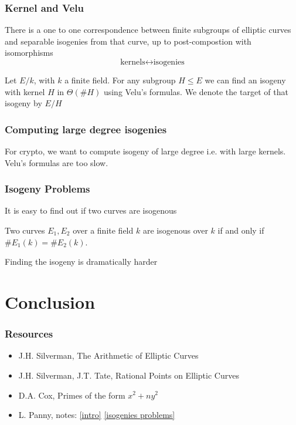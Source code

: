 \documentclass{beamer}
\begin{document}
\begin{frame}
    \frametitle{Kernel and Velu}
    \begin{theorem}
       There is a one to one correspondence between finite subgroups of elliptic curves 
       and separable isogenies from that curve, up to post-compostion with isomorphisms
       \[ \text{kernels} \longleftrightarrow \text{isogenies} \]

    \end{theorem}
       Let $E/k$, with $k$ a finite field. For any subgroup $H \leq E$ we can find an 
       isogeny with kernel $H$ in $\Theta(\#H)$ using Velu's formulas. We denote the target of 
       that isogeny by $E/H$
    
\end{frame}

\begin{frame}
    \frametitle{Computing large degree isogenies}
    For crypto, we want to compute isogeny of large degree i.e. with large kernels.
    Velu's formulas are too slow.
\end{frame}

\begin{frame}
    \frametitle{Isogeny Problems}
    It is easy to find out if two curves are isogenous
    \begin{theorem}
        Two curves $E_1, E_2$ over a finite field $k$ are isogenous over $k$ if and only if $\#E_1(k) = \#E_2(k)$.
    \end{theorem}
   Finding the isogeny is dramatically harder 
\end{frame}

\section{Conclusion}

\begin{frame}
    \frametitle{Resources}
    \begin{itemize}
        \item  J.H. Silverman, The Arithmetic of Elliptic Curves
        \item  J.H. Silverman, J.T. Tate, Rational Points on Elliptic Curves 
        \item  D.A. Cox, Primes of the form $x^2 + n y^2$
        \item L. Panny, notes: \href{https://yx7.cc/docs/misc/isog_bristol_notes.pdf}{[intro]} \href{https://yx7.cc/docs/misc/isogprob_bristol_notes.pdf}{[isogenies problems]}
    \end{itemize}
\end{frame}
\end{document}
